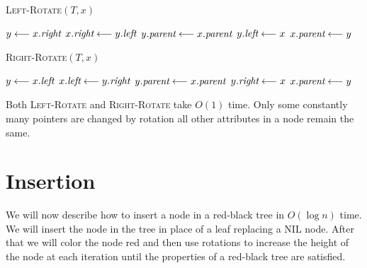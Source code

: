\begin{minipage}{0.46\textwidth}
	\begin{algorithm}[H]
	\caption{\textsc{Left-Rotate}$({T,x})$}
	\DontPrintSemicolon
	$y\longleftarrow x.\emph{right}$\;
	$x.\emph{right}\longleftarrow y.\emph{left}$\;
	$y.\emph{parent}\longleftarrow x.\emph{parent}$\;
	$y.\emph{left}\longleftarrow x$\;
	$x.\emph{parent}\longleftarrow y$
\end{algorithm}
\end{minipage}\hfill
\begin{minipage}{0.46\textwidth}
	\begin{algorithm}[H]
		\caption{\textsc{Right-Rotate}$({T,x})$}
		\DontPrintSemicolon
		$y\longleftarrow x.\emph{left}$\;
		$x.\emph{left}\longleftarrow y.\emph{right}$\;
		$y.\emph{parent}\longleftarrow x.\emph{parent}$\;
		$y.\emph{right}\longleftarrow x$\;
		$x.\emph{parent}\longleftarrow y$
	\end{algorithm}
\end{minipage}\parinn

Both \textsc{Left-Rotate} and \textsc{Right-Rotate} take $O(1)$ time. Only some constantly many pointers are changed by rotation all other attributes in a node remain the same. 
\section{Insertion}
We will now describe how to insert a node in a red-black tree in $O(\log n)$ time. We will insert the node in the tree in place of a leaf replacing a NIL node. After that we will color the node red and then use rotations to increase the height of the node at each iteration until the properties of a red-black tree are satisfied. 


